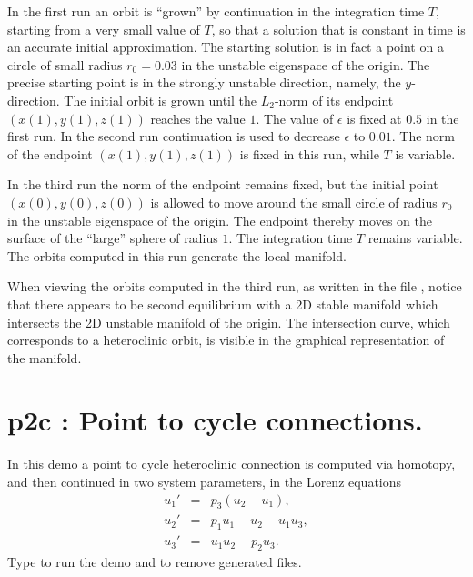\documentclass[12pt]{report}
\def\eps{\epsilon}
\begin{document}
In the first run an orbit is ``grown'' by continuation in the integration time 
$T$, starting from a very small value of $T$, so that a solution that is
constant in time is an accurate initial approximation. The starting solution is 
in fact a point on a circle of small radius $r_0=0.03$ in the unstable eigenspace
of the origin. 
The precise starting point is in the strongly unstable direction, namely, the
$y$-direction.
The initial orbit is grown until the $L_2$-norm of its endpoint 
$(x(1),y(1),z(1))$ reaches the value $1$. 
The value of $\eps$ is fixed at $0.5$ in the first run. In the second run 
continuation is used to decrease $\eps$ to $0.01$. The norm of the endpoint  
$(x(1),y(1),z(1))$ is fixed in this run, while $T$ is variable.

In the third run the norm of the endpoint remains fixed, but the 
initial point $(x(0),y(0),z(0))$ is allowed to move around the small circle of 
radius $r_0$ in the unstable eigenspace of the origin.  
The endpoint thereby moves on the surface of the ``large'' sphere of radius 
$1$. The integration time $T$ remains variable.
The orbits computed in this run generate the local manifold.

When viewing the orbits computed in the third run, as written in the file 
, notice that there appears to be second equilibrium with a 2D 
stable manifold which intersects the 2D unstable manifold of the origin. 
The intersection curve, which corresponds to a heteroclinic orbit,
is visible in the graphical representation of the manifold. 

\newpage
%
\section{ p2c : Point to cycle connections.} \label{sec:Demos_p2c}
In this demo a point to cycle heteroclinic connection is computed via
homotopy, and then continued in two system parameters, in the Lorenz equations
\begin{eqnarray*}
  u_1' &=&  p_3 (u_2 - u_1), \\
  u_2' &=&  p_1 u_1 - u_2 - u_1 u_3,  \\
  u_3' &=&  u_1 u_2 - p_2 u_3. \end{eqnarray*}
Type  to run the demo and
 to remove generated files.
\end{document}
